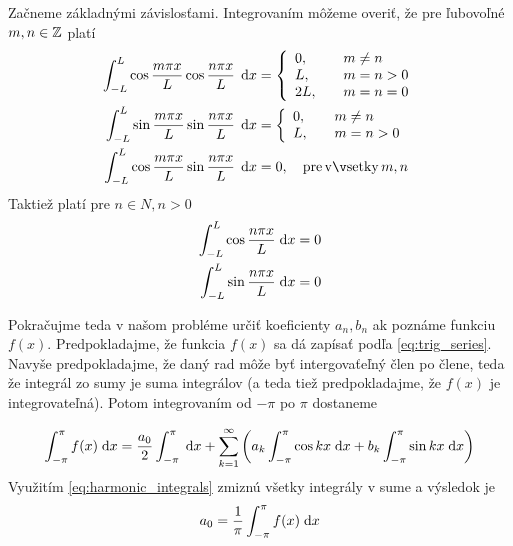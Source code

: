 Začneme základnými závislosťami. Integrovaním môžeme overiť, že pre
ľubovoľné $m,n \in \mathbb{Z}$ platí
\begin{align}
     \intLL \cos \frac{m \pi x}{L} 
     \cos\frac{n \pi x}{L}\, \dd x &= 
     \left\{
        \begin{array}{l l}
            0,& \quad m\not=n \\
            L,& \quad m=n>0 \\
            2L,& \quad m=n=0
        \end{array}
     \right. \nonumber\\
     \intLL \sin \frac{m \pi x}{L} 
     \sin\frac{n \pi x}{L}\, \dd x &= 
     \left\{
        \begin{array}{l l}
            0,& \quad m\not=n \\
            L,& \quad m=n > 0
        \end{array}    
     \right. \nonumber\\
     \intLL \cos \frac{m \pi x}{L}
     \sin \frac{n \pi x}{L}\, \dd x &= 0,
        \quad {\rm pre\, všetky\,} m,n
        \label{eq:basic_orthogonality}
\end{align}
Taktiež platí pre $n \in N, n>0$
\begin{align}
     \int_{-L}^{L} \cos \frac{n \pi x}{L} \; \mathrm{d} x = {}& 0 \nonumber \\
     \int_{-L}^{L} \sin \frac{n \pi x}{L} \; \mathrm{d} x = {}& 0 
    \label{eq:harmonic_integrals}
\end{align}


Pokračujme teda v našom probléme určiť koeficienty $a_n,b_n$ ak
poznáme funkciu $f(x)$.
Predpokladajme, že funkcia $f(x)$ sa dá zapísať podľa
\ref{eq:trig_series}. Navyše predpokladajme, že daný rad môže byť
intergovaťeľný člen po člene, teda že integrál zo sumy je suma
integrálov (a teda tiež predpokladajme, že $f(x)$ je integrovateľná).
Potom integrovaním od $-\pi$ po $\pi$ dostaneme


\begin{equation}
    \int_{-\pi}^{\pi} f(x) \; \mathrm{d} x = \frac{a_0}{2} \int_{-\pi}^{\pi} \; \mathrm{d} x +
        \sum_{k=1}^{\infty} \left( 
            a_k \int_{-\pi}^{\pi} \cos kx  \; \mathrm{d} x +
            b_k \int_{-\pi}^{\pi} \sin kx  \; \mathrm{d} x
        \right)
\end{equation}
Využitím \ref{eq:harmonic_integrals} zmiznú všetky integrály v sume a
výsledok je
\begin{equation}
   a_0 = \frac{1}{\pi} \int_{-\pi}^{\pi} f(x) \; \mathrm{d} x 
\end{equation}


